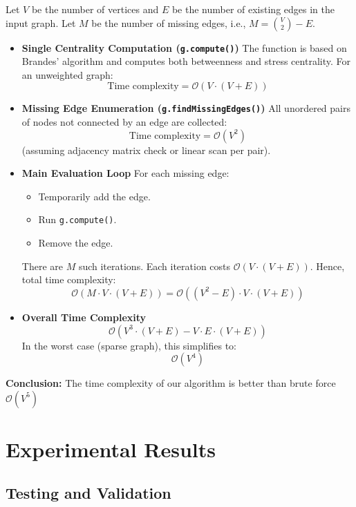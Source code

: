 \documentclass[12pt]{article}
\begin{document}
Let \( V \) be the number of vertices and \( E \) be the number of existing edges in the input graph. Let \( M \) be the number of missing edges, i.e., \( M = \binom{V}{2} - E \).

\begin{itemize}
	\item \textbf{Single Centrality Computation (\texttt{g.compute()})}
	      The function is based on Brandes' algorithm and computes both betweenness and stress centrality. For an unweighted graph:
	      \[
		      \text{Time complexity} = \mathcal{O}(V \cdot (V + E))
	      \]

	\item \textbf{Missing Edge Enumeration (\texttt{g.findMissingEdges()})}
	      All unordered pairs of nodes not connected by an edge are collected:
	      \[
		      \text{Time complexity} = \mathcal{O}(V^2)
	      \]
	      (assuming adjacency matrix check or linear scan per pair).

	\item \textbf{Main Evaluation Loop}
	      For each missing edge:
	      \begin{itemize}
		      \item Temporarily add the edge.
		      \item Run \texttt{g.compute()}.
		      \item Remove the edge.
	      \end{itemize}
	      There are \( M \) such iterations. Each iteration costs \( \mathcal{O}(V \cdot (V + E)) \). Hence, total time complexity:
	      \[
		      \mathcal{O}(M \cdot V \cdot (V + E)) = \mathcal{O}((V^2 - E) \cdot V \cdot (V + E))
	      \]

	\item \textbf{Overall Time Complexity}
	      \[
		      \mathcal{O}(V^3 \cdot (V + E) - V \cdot E \cdot (V + E))
	      \]
	      In the worst case (sparse graph), this simplifies to:
	      \[
		      \mathcal{O}(V^4)
	      \]
\end{itemize}

\noindent
\textbf{Conclusion:} The time complexity of our algorithm is better than brute
force \( \mathcal{O}(V^5) \)

\section{Experimental Results}
\subsection{Testing and Validation}
\end{document}
